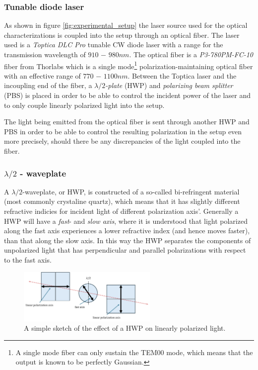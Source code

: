 \subsubsection{Tunable diode laser}

As shown in figure \ref{fig:experimental_setup} the laser source used for the optical characterizations is coupled into the setup through an optical fiber. The laser used is a \emph{Toptica DLC Pro} tunable CW diode laser with a range for the transmission wavelength of $910$ $-$ $980nm$. The optical fiber is a \emph{P3-780PM-FC-10} fiber from Thorlabs which is a single mode\footnote{A single mode fiber can only sustain the TEM00 mode, which means that the output is known to be perfectly Gaussian.} polarization-maintaining optical fiber with an effective range of $770$ $-$ $1100nm$. Between the Toptica laser and the incoupling end of the fiber, a $\lambda/2$\emph{-plate} (HWP) and \emph{polarizing beam splitter} (PBS) is placed in order to be able to control the incident power of the laser and to only couple linearly polarized light into the setup.  

The light being emitted from the optical fiber is sent through another HWP and PBS in order to be able to control the resulting polarization in the setup even more precisely, should there be any discrepancies of the light coupled into the fiber. 

\subsubsection{$\lambda / 2$ - waveplate}

A $\lambda/2$-waveplate, or HWP, is constructed of a so-called bi-refringent material (most commonly crystaline quartz), which means that it has slightly different refractive indicies for incident light of different polarization axis'. Generally a HWP will have a \emph{fast}- and \emph{slow axis}, where it is understood that light polarized along the fast axis experiences a lower refractive index (and hence moves faster), than that along the slow axis. In this way the HWP separates the components of unpolarized light that has perpendicular and parallel polarizations with respect to the fast axis. 

\begin{figure}[h!]
    \centering
    \includegraphics[width=0.6\textwidth]{figures/HWP.pdf}
    \caption{A simple sketch of the effect of a HWP on linearly polarized light.}
    \label{fig:HWP}
\end{figure}


